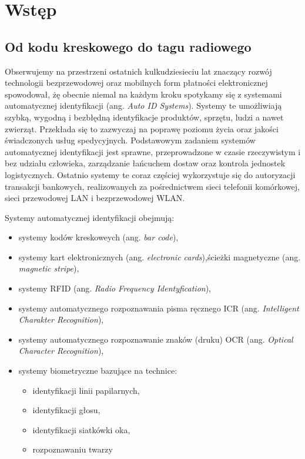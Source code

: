 
\singlespacing
\chapter{Wstęp}

\section{Od kodu kreskowego do tagu radiowego}

Obserwujemy na przestrzeni ostatnich kulkudziesieciu lat znaczący rozwój technologii bezprzewodowej oraz mobilnych form płatności elektronicznej spowodował, żę obecnie niemal na każdym kroku spotykamy się z systemami automatycznej identyfikacji (ang. \emph{Auto ID Systems}). Systemy te umożliwiają szybką, wygodną i bezbłędną identyfikacje produktów, sprzętu, ludzi a nawet zwierząt. Przekłada się to zazwyczaj na poprawę poziomu życia oraz jakości świadczonych usług spedycyjnych. Podstawowym zadaniem systemów automatycznej identyfikacji jest sprawne, przeprowadzone w czasie rzeczywistym i bez udziału człowieka, zarządzanie łańcuchem dostaw oraz kontrola jednostek logistycznych. Ostatnio systemy te coraz częściej wykorzystuje się do autoryzacji transakcji bankowych, realizowanych za pośrednictwem sieci telefonii komórkowej, sieci przewodowej LAN i bezprzewodowej WLAN.


\noindent 
\newline Systemy automatycznej identyfikacji obejmują:
\begin{itemize}\setlength{\itemsep}{0pt}
    \item systemy kodów kreskoweych (ang. \emph{bar code}),
    \item systemy kart elektronicznych (ang. \emph{electronic cards}),ścieżki magnetyczne (ang. \emph{magnetic stripe}),
    \item systemy RFID (ang. \emph{Radio Frequency Identyfication}),
    \item systemy automatycznego rozpoznawania pisma ręcznego ICR (ang. \emph{Intelligent Charakter Recognition}), 
    \item systemy automatycznego rozpoznawanie znaków (druku) OCR (ang. \emph{Optical Character Recognition}),
    \item systemy biometryczne bazujące na technice:
	\begin{itemize}\setlength{\itemsep}{0pt}
		\item identyfikacji linii papilarnych,
		\item identyfikacji głosu,
		\item identyfikacji siatkówki oka,
		\item rozpoznawaniu twarzy
	\end{itemize}
\end{itemize}


